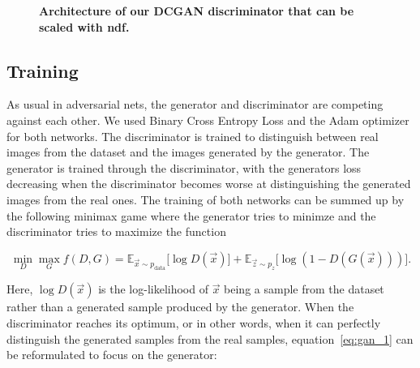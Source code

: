             \begin{figure}[h]
                \centering
                \caption[DCGAN discriminator architecture]
                {
                    \textbf{Architecture of our DCGAN discriminator that can be scaled with ndf.}
                }
                \label{fig:architecture_dcgan_ours_discriminator}
            \end{figure}

        \subsection{Training}
            As usual in adversarial nets, the generator and discriminator are competing against each other. We used Binary Cross Entropy Loss and the Adam optimizer for both networks. The discriminator is trained to distinguish between real images from the dataset and the images generated by the generator. The generator is trained through the discriminator, with the generators loss decreasing when the discriminator becomes worse at distinguishing the generated images from the real ones. The training of both networks can be summed up by the following minimax game where the generator tries to minimze and the discriminator tries to maximize the function~\cite{gan}

            \begin{equation}
                \min_D \max_G f(D, G) =
                \mathbb{E}_{\vec{x} \sim p_{\text{data}}}
                    \bigl[ \log D(\vec{x}) \bigr] +
                \mathbb{E}_{\vec{z} \sim p_z}
                    \bigl[ \log \left( 1 - D(G(\vec{x})) \right) \bigr].
                \label{eq:gan_1}
            \end{equation}

            Here, $\log D(\vec{x})$ is the log-likelihood of $\vec{x}$ being a sample from the dataset rather than a generated sample produced by the generator. When the discriminator reaches its optimum, or in other words, when it can perfectly distinguish the generated samples from the real samples, equation~\ref{eq:gan_1} can be reformulated to focus on the generator:

